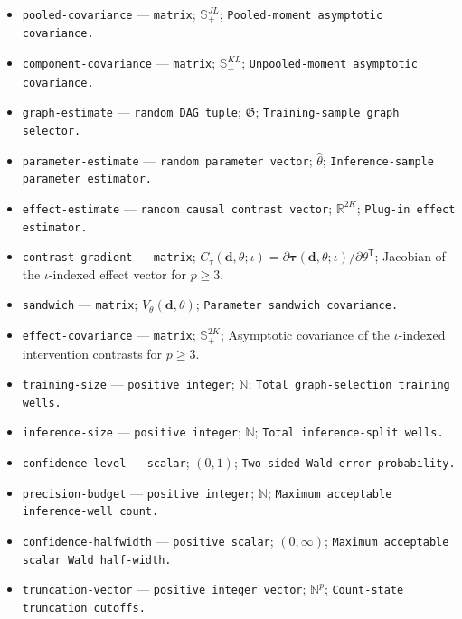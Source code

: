 \documentclass{article}
\begin{document}
\begin{itemize}
  \item \texttt{pooled-\allowbreak{}covariance} --- \texttt{matrix}; \(\mathbb S_+^{JL}\); \texttt{Pooled-\allowbreak{}moment asymptotic covariance.}
  \item \texttt{component-\allowbreak{}covariance} --- \texttt{matrix}; \(\mathbb S_+^{KL}\); \texttt{Unpooled-\allowbreak{}moment asymptotic covariance.}
  \item \texttt{graph-\allowbreak{}estimate} --- \texttt{random DAG tuple}; \(\mathfrak G\); \texttt{Training-\allowbreak{}sample graph selector.}
  \item \texttt{parameter-\allowbreak{}estimate} --- \texttt{random parameter vector}; \(\widehat\theta\); \texttt{Inference-\allowbreak{}sample parameter estimator.}
  \item \texttt{effect-\allowbreak{}estimate} --- \texttt{random causal contrast vector}; \(\mathbb R^{2K}\); \texttt{Plug-\allowbreak{}in effect estimator.}
  \item \texttt{contrast-\allowbreak{}gradient} --- \texttt{matrix}; \(C_\tau(\boldsymbol d,\theta;\iota)=\partial\boldsymbol\tau(\boldsymbol d,\theta;\iota)/\partial\theta^{\mathsf T}\); Jacobian of the \(\iota\)-indexed effect vector for \(p\geq3\).
  \item \texttt{sandwich} --- \texttt{matrix}; \(V_\theta(\boldsymbol d,\theta)\); \texttt{Parameter sandwich covariance.}
  \item \texttt{effect-\allowbreak{}covariance} --- \texttt{matrix}; \(\mathbb S_+^{2K}\); Asymptotic covariance of the \(\iota\)-indexed intervention contrasts for \(p\geq3\).
  \item \texttt{training-\allowbreak{}size} --- \texttt{positive integer}; \(\mathbb N\); \texttt{Total graph-\allowbreak{}selection training wells.}
  \item \texttt{inference-\allowbreak{}size} --- \texttt{positive integer}; \(\mathbb N\); \texttt{Total inference-\allowbreak{}split wells.}
  \item \texttt{confidence-\allowbreak{}level} --- \texttt{scalar}; \((0,1)\); \texttt{Two-\allowbreak{}sided Wald error probability.}
  \item \texttt{precision-\allowbreak{}budget} --- \texttt{positive integer}; \(\mathbb N\); \texttt{Maximum acceptable inference-\allowbreak{}well count.}
  \item \texttt{confidence-\allowbreak{}halfwidth} --- \texttt{positive scalar}; \((0,\infty)\); \texttt{Maximum acceptable scalar Wald half-\allowbreak{}width.}
  \item \texttt{truncation-\allowbreak{}vector} --- \texttt{positive integer vector}; \(\mathbb N^p\); \texttt{Count-\allowbreak{}state truncation cutoffs.}

\end{itemize}
\end{document}
